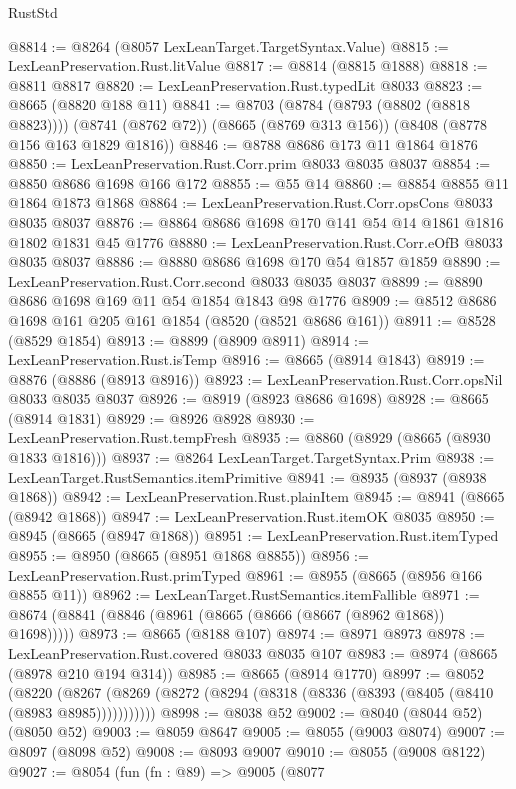 \begin{lexlean}{RustStd}
\begin{coremodule}
@8814 := @8264 (@8057 LexLeanTarget.TargetSyntax.Value)
@8815 := LexLeanPreservation.Rust.litValue
@8817 := @8814 (@8815 @1888)
@8818 := @8811 @8817
@8820 := LexLeanPreservation.Rust.typedLit @8033
@8823 := @8665 (@8820 @188 @11)
@8841 := @8703
    (@8784 (@8793 (@8802 (@8818 @8823))))
    (@8741 (@8762 @72))
    (@8665 (@8769 @313 @156))
    (@8408 (@8778 @156 @163 @1829 @1816))
@8846 := @8788 @8686 @173 @11 @1864 @1876
@8850 := LexLeanPreservation.Rust.Corr.prim @8033 @8035 @8037
@8854 := @8850 @8686 @1698 @166 @172
@8855 := @55 @14
@8860 := @8854 @8855 @11 @1864 @1873 @1868
@8864 := LexLeanPreservation.Rust.Corr.opsCons @8033 @8035 @8037
@8876 := @8864 @8686 @1698 @170 @141 @54 @14 @1861 @1816 @1802 @1831 @45 @1776
@8880 := LexLeanPreservation.Rust.Corr.eOfB @8033 @8035 @8037
@8886 := @8880 @8686 @1698 @170 @54 @1857 @1859
@8890 := LexLeanPreservation.Rust.Corr.second @8033 @8035 @8037
@8899 := @8890 @8686 @1698 @169 @11 @54 @1854 @1843 @98 @1776
@8909 := @8512 @8686 @1698 @161 @205 @161 @1854 (@8520 (@8521 @8686 @161))
@8911 := @8528 (@8529 @1854)
@8913 := @8899 (@8909 @8911)
@8914 := LexLeanPreservation.Rust.isTemp
@8916 := @8665 (@8914 @1843)
@8919 := @8876 (@8886 (@8913 @8916))
@8923 := LexLeanPreservation.Rust.Corr.opsNil @8033 @8035 @8037
@8926 := @8919 (@8923 @8686 @1698)
@8928 := @8665 (@8914 @1831)
@8929 := @8926 @8928
@8930 := LexLeanPreservation.Rust.tempFresh
@8935 := @8860 (@8929 (@8665 (@8930 @1833 @1816)))
@8937 := @8264 LexLeanTarget.TargetSyntax.Prim
@8938 := LexLeanTarget.RustSemantics.itemPrimitive
@8941 := @8935 (@8937 (@8938 @1868))
@8942 := LexLeanPreservation.Rust.plainItem
@8945 := @8941 (@8665 (@8942 @1868))
@8947 := LexLeanPreservation.Rust.itemOK @8035
@8950 := @8945 (@8665 (@8947 @1868))
@8951 := LexLeanPreservation.Rust.itemTyped
@8955 := @8950 (@8665 (@8951 @1868 @8855))
@8956 := LexLeanPreservation.Rust.primTyped
@8961 := @8955 (@8665 (@8956 @166 @8855 @11))
@8962 := LexLeanTarget.RustSemantics.itemFallible
@8971 := @8674 (@8841 (@8846 (@8961 (@8665 (@8666 (@8667 (@8962 @1868)) @1698)))))
@8973 := @8665 (@8188 @107)
@8974 := @8971 @8973
@8978 := LexLeanPreservation.Rust.covered @8033 @8035 @107
@8983 := @8974 (@8665 (@8978 @210 @194 @314))
@8985 := @8665 (@8914 @1770)
@8997 := @8052
    (@8220 (@8267 (@8269 (@8272 (@8294 (@8318 (@8336 (@8393 (@8405 (@8410 (@8983 @8985)))))))))))
@8998 := @8038 @52
@9002 := @8040 (@8044 @52) (@8050 @52)
@9003 := @8059 @8647
@9005 := @8055 (@9003 @8074)
@9007 := @8097 (@8098 @52)
@9008 := @8093 @9007
@9010 := @8055 (@9008 @8122)
@9027 := @8054
    (fun (fn : @89) =>
    @9005
      (@8077

\end{coremodule}
\end{lexlean}
